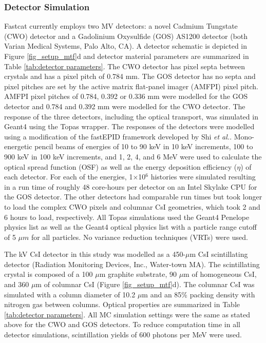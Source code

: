 \subsubsection{Detector Simulation \label{sec:det}}

Fastcat currently employs two MV detectors: a novel Cadmium Tungstate (CWO) detector\cite{Star-Lack2015AImaging}  and a Gadolinium Oxysulfide (GOS) AS1200 detector\cite{Shi2018APerformance} (both Varian Medical Systems, Palo Alto, CA).  A detector schematic is depicted in Figure \ref{fig_setup_mtf}d and detector material parameters are summarized in Table \ref{tab:detector parameters}.  The CWO detector has pixel septa between crystals and has a pixel pitch of 0.784 mm. The GOS detector has no septa and pixel pitches are set by the active matrix flat-panel imager (AMFPI) pixel pitch. AMFPI pixel pitches of 0.784, 0.392 or 0.336 mm were modelled for the GOS detector and 0.784 and 0.392 mm were modelled for the CWO detector. 
The response of the three detectors, including the optical transport, was simulated in Geant4 \cite{Agostinelli2003Geant4Toolkit} using the Topas \cite{Perl2012Topas:Applications} wrapper.
The responses of the detectors were modelled using a modification of the fastEPID framework developed by Shi \textit{et al.}\cite{Shi2019ADetectors.}. Mono-energetic pencil beams of energies of 10 to 90 keV in 10 keV increments, 100 to 900 keV in 100 keV increments, and 1, 2, 4, and 6 MeV were used to calculate the optical spread function (OSF) as well as the energy deposition efficiency ($\eta$) of each detector. For each of the energies, 1$\times$10$^6$ histories were simulated resulting in a run time of roughly 48 core-hours per detector on an Intel Skylake CPU for the GOS detector. The other detectors had comparable run times but took longer to load the complex CWO pixels and columnar CsI geometries, which took 2 and 6 hours to load, respectively. All Topas simulations used the Geant4 Penelope physics list as well as the Geant4 optical physics list with a particle range cutoff of 5 $\mu m$ for all particles. No variance reduction techniques (VRTs) were used.

 The kV CsI detector in this study was modelled as a 450-$\mu$m CsI scintillating detector\cite{Sharma2012EffectiveGlasses} (Radiation Monitoring Devices, Inc., Water-town MA).  The scintillating crystal is composed of a 100 $\mu$m graphite substrate, 90 $\mu$m of homogeneous CsI, and 360 $\mu$m of columnar CsI (Figure \ref{fig_setup_mtf}d). The columnar CsI was simulated with a column diameter of 10.2 $\mu$m and an 85\% packing density with nitrogen gas between columns. Optical properties are summarized in Table \ref{tab:detector parameters}. All MC simulation settings were the same as stated above for the CWO and GOS detectors. To reduce computation time in all detector simulations, scintillation yields of 600 photons per MeV were used.


